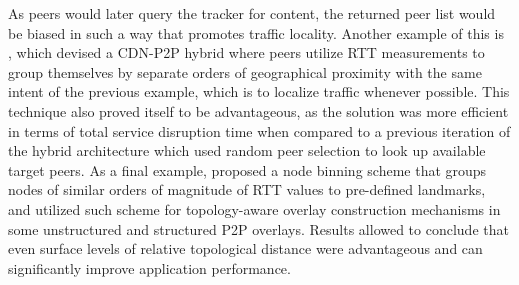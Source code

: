 \begin{itemize}
            As peers would later query the tracker for content, the returned peer list would be biased in such a way that promotes traffic locality.
            Another example of this is \cite{kim2011}, which devised a CDN-P2P hybrid where peers utilize RTT measurements to group themselves by separate orders of geographical proximity with the same intent of the previous example, which is to localize traffic whenever possible.
            This technique also proved itself to be advantageous, as the solution was more efficient in terms of total service disruption time when compared to a previous iteration of the hybrid architecture which used random peer selection to look up available target peers.
            As a final example, \cite{topology-aware-p2p-server-selection} proposed a node binning scheme that groups nodes of similar orders of magnitude of RTT values to pre-defined landmarks, and utilized such scheme for topology-aware overlay construction mechanisms in some unstructured and structured P2P overlays.
            Results allowed to conclude that even surface levels of relative topological distance were advantageous and can significantly improve application performance.


\end{itemize}
